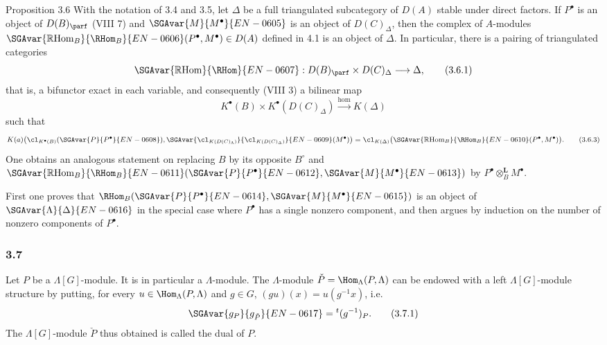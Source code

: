 \begin{statement}{Proposition 3.6}
With the notation of 3.4 and 3.5, let $\Delta$ be a full triangulated subcategory of $D(A)$ stable under direct factors. If $P^\bullet$ is an object of $D(B)_{\parf}$ (VIII 7) and $\SGAvar{M}{M^\bullet}{EN-0605}$ is an object of $D(C)_{\Delta}$, then the complex of $A$-modules $\SGAvar{\mathbb{R}\mathrm{Hom}_B}{\RHom_B}{EN-0606}(P^\bullet,M^\bullet)\in D(A)$ defined in 4.1 is an object of $\Delta$. In particular, there is a pairing of triangulated categories
\[
\SGAvar{\mathbb{R}\mathrm{Hom}}{\RHom}{EN-0607}:D(B)_{\parf}\times D(C)_{\Delta}\longrightarrow \Delta,
\tag{3.6.1}
\]
that is, a bifunctor exact in each variable, and consequently (VIII 3) a bilinear map
\[
K^{\bullet}(B)\times K^{\bullet}(D(C)_{\Delta})\xrightarrow{\operatorname{hom}} K(\Delta)
\tag{3.6.2}
\]
such that
\[
K(a)\bigl(\cl_{K^{\bullet}(B)}(\SGAvar{P}{P^\bullet}{EN-0608}),\SGAvar{\cl_{K(D(C)_{\Lambda})}}{\cl_{K(D(C)_{\Delta})}}{EN-0609}(M^\bullet)\bigr)
=\cl_{K(\Delta)}\bigl(\SGAvar{\mathbb{R}\mathrm{Hom}_B}{\RHom_B}{EN-0610}(P^\bullet,M^\bullet)\bigr).
\tag{3.6.3}
\]
One obtains an analogous statement on replacing $B$ by its opposite $B^\circ$ and $\SGAvar{\mathbb{R}\mathrm{Hom}_B}{\RHom_B}{EN-0611}(\SGAvar{P}{P^\bullet}{EN-0612},\SGAvar{M}{M^\bullet}{EN-0613})$ by $P^\bullet\otimes_B^{\mathbf L}M^\bullet$.
\end{statement}

\begin{prooftext}[Proof]
First one proves that $\RHom_B(\SGAvar{P}{P^\bullet}{EN-0614},\SGAvar{M}{M^\bullet}{EN-0615})$ is an object of $\SGAvar{\Lambda}{\Delta}{EN-0616}$ in the special case where $P^\bullet$ has a single nonzero component, and then argues by induction on the number of nonzero components of $P^\bullet$.
\end{prooftext}

\subsubsection*{3.7}

Let $P$ be a $\Lambda[G]$-module. It is in particular a $\Lambda$-module. The $\Lambda$-module $\check P=\Hom_\Lambda(P,\Lambda)$ can be endowed with a left $\Lambda[G]$-module structure by putting, for every $u\in\Hom_\Lambda(P,\Lambda)$ and $g\in G$, $(gu)(x)=u(g^{-1}x)$, i.e.
\[
\SGAvar{g_{ P}}{g_{\check P}}{EN-0617}={}^{t}(g^{-1})_P.
\tag{3.7.1}
\]
The $\Lambda[G]$-module $\check P$ thus obtained is called the dual of $P$.

